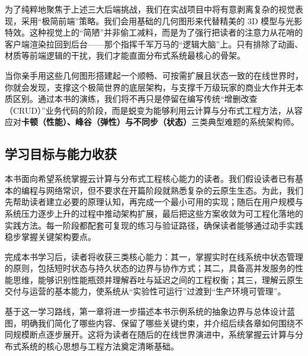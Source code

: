 为了纯粹地聚焦于上述三大后端挑战，我们在实战项目中将有意剥离复杂的视觉表现，采用“极简前端”策略。我们会用基础的几何图形来代替精美的 3D 模型与光影特效。这种视觉上的“简陋”并非偷工减料，而是为了强行把读者的注意力从花哨的客户端渲染拉回到后台——那个指挥千军万马的“逻辑大脑”上。只有排除了动画、材质等前端逻辑的干扰，我们才能直面分布式系统最核心的骨架。

当你亲手用这些几何图形搭建起一个顺畅、可按需扩展且状态一致的在线世界时，你就会发现，支撑这个极简世界的底层架构，与支撑千万级玩家的商业大作并无本质区别。通过本书的演练，我们将不再只是停留在编写传统“增删改查（CRUD）”业务代码的阶段，而是蜕变为能够利用云计算与分布式工程方法，从容应对\textbf{卡顿（性能）、峰谷（弹性）与不同步（状态）}三类典型难题的系统架构师。


\subsection*{学习目标与能力收获}

本书面向希望系统掌握云计算与分布式工程核心能力的读者。我们假设读者已有基本的编程与网络常识，但不要求在开篇阶段就熟悉复杂的云原生生态。为此，我们先帮助读者建立必要的原理认知，再完成一个最小可用的实现；随后在用户规模与系统压力逐步上升的过程中推动架构扩展，最后把这些方案收敛为可工程化落地的实践方法。每一阶段都配套可复现的练习与验证路径，确保读者能够通过动手实践稳步掌握关键架构要点。

完成本书学习后，读者将收获三类核心能力：其一，掌握实时在线系统中状态管理的原则，包括短时状态与持久状态的边界与协作方式；其二，具备高并发服务的性能思维，能够识别性能瓶颈并理解吞吐与延迟之间的工程权衡；其三，理解云原生交付与运营的基本能力，使系统从“实验性可运行”过渡到“生产环境可管理”。

基于这一学习路线，第一章将进一步描述本书示例系统的抽象边界与总体设计蓝图，明确我们简化了哪些内容、保留了哪些关键约束，并介绍后续各章如何围绕不同规模断点逐步展开。这将为读者在随后的在线世界演进中，系统掌握云计算与分布式系统的核心思想与工程方法奠定清晰基础。

\newpage